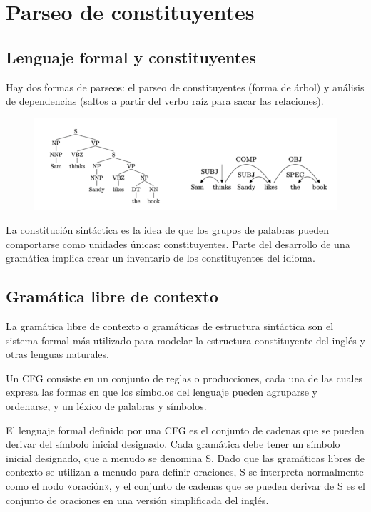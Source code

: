 \chapter{Parseo de constituyentes}
\section{Lenguaje formal y constituyentes}
Hay dos formas de parseos: el parseo de constituyentes (forma de árbol) y análisis de dependencias (saltos a partir del verbo raíz para sacar las relaciones). 

\begin{figure}[h]
\centering
\includegraphics[width = \textwidth]{figs/parseo.png}
\end{figure}

La constitución sintáctica es la idea de que los grupos de palabras pueden comportarse como unidades únicas: constituyentes. Parte del desarrollo de una gramática implica crear un inventario de los constituyentes del idioma.

\section{Gramática libre de contexto}
La gramática libre de contexto o gramáticas de estructura sintáctica son el sistema formal más utilizado para modelar la estructura constituyente del inglés y otras lenguas naturales.

Un CFG consiste en un conjunto de reglas o producciones, cada una de las cuales expresa las formas en que los símbolos del lenguaje pueden agruparse y ordenarse, y un léxico de palabras y símbolos. 

El lenguaje formal definido por una CFG es el conjunto de cadenas que se pueden derivar del símbolo inicial designado. Cada gramática debe tener un símbolo inicial designado, que a menudo se denomina S. Dado que las gramáticas libres de contexto se utilizan a menudo para definir oraciones, S se interpreta normalmente como el nodo «oración», y el conjunto de cadenas que se pueden derivar de S es el conjunto de oraciones en una versión simplificada del inglés. 

